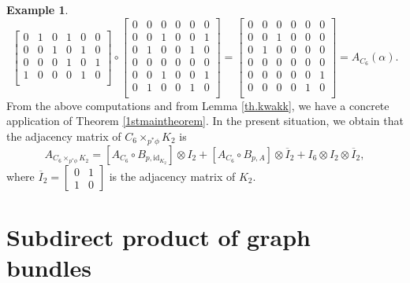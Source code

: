\documentclass{amsart}
\theoremstyle{definition}
\newtheorem{example}[theo]{Example}
\numberwithin{equation}{section}
\begin{document}
\begin{example}
\begin{equation*}
\begin{bmatrix}
0 & 1 & 0 &1 &0 &0\\
0 & 0 & 1 &0 &1 &0\\
0 & 0 & 0 &1 &0 &1\\
1 & 0 & 0 &0 &1 &0\\
\end{bmatrix}
\circ 
\begin{bmatrix}
0 & 0 & 0 &0 &0 &0\\
0 & 0 & 1 &0 &0 &1\\
0 & 1 & 0 &0 &1 &0\\
0 & 0 & 0 &0 &0 &0\\
0 & 0 & 1 &0 &0 &1\\
0 & 1 & 0 &0 &1 &0\\
\end{bmatrix}
=
\begin{bmatrix}
0 & 0 & 0 &0 &0 &0\\
0 & 0 & 1 &0 &0 &0\\
0 & 1 & 0 &0 &0 &0\\
0 & 0 & 0 &0 &0 &0\\
0 & 0 & 0 &0 &0 &1\\
0 & 0 & 0 &0 &1 &0\\
\end{bmatrix}
=A_{C_6}(\alpha).
\end{equation*}
From the above computations and from Lemma \ref{th.kwakk}, we have a concrete application of Theorem \ref{1stmaintheorem}. In the present situation,  we  obtain that the adjacency matrix of $C_6 \times_{p^*\phi} K_2$ is 
\begin{equation}
    A_{C_6 \times_{p^*\phi} K_2}    = [A_{C_6} \circ B_{p,\mathrm{id}_{K_2}}] \otimes I_2 + [A_{C_6} \circ B_{p,A}] \otimes \overline{I}_2 + I_6 \otimes I_{2} \otimes \overline{I}_2,
\end{equation}
where $\overline{I}_2 =  \begin{bmatrix}0 & 1 \\ 1 & 0\end{bmatrix}$ is the adjacency matrix of $K_2$.
\end{example}




\section{Subdirect product of graph bundles}\label{section4}
\end{document}
